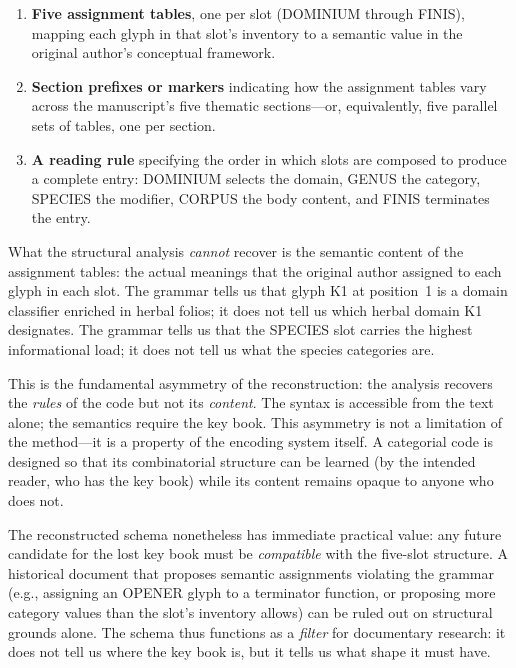 \begin{enumerate}[nosep]
  \item \textbf{Five assignment tables}, one per slot (DOMINIUM through
    FINIS), mapping each glyph in that slot's inventory to a semantic
    value in the original author's conceptual framework.
  \item \textbf{Section prefixes or markers} indicating how the
    assignment tables vary across the manuscript's five thematic
    sections---or, equivalently, five parallel sets of tables, one
    per section.
  \item \textbf{A reading rule} specifying the order in which slots
    are composed to produce a complete entry: DOMINIUM selects the
    domain, GENUS the category, SPECIES the modifier, CORPUS the
    body content, and FINIS terminates the entry.
\end{enumerate}

What the structural analysis \emph{cannot} recover is the semantic
content of the assignment tables: the actual meanings that the original
author assigned to each glyph in each slot. The grammar tells us that
glyph K1 at position~1 is a domain classifier enriched in herbal
folios; it does not tell us which herbal domain K1 designates. The
grammar tells us that the SPECIES slot carries the highest
informational load; it does not tell us what the species categories
are.

This is the fundamental asymmetry of the reconstruction: the analysis
recovers the \emph{rules} of the code but not its \emph{content}. The
syntax is accessible from the text alone; the semantics require the
key book. This asymmetry is not a limitation of the method---it is a
property of the encoding system itself. A categorial code is designed
so that its combinatorial structure can be learned (by the intended
reader, who has the key book) while its content remains opaque to
anyone who does not.

The reconstructed schema nonetheless has immediate practical value:
any future candidate for the lost key book must be \emph{compatible}
with the five-slot structure. A historical document that proposes
semantic assignments violating the grammar (e.g., assigning an OPENER
glyph to a terminator function, or proposing more category values
than the slot's inventory allows) can be ruled out on structural
grounds alone. The schema thus functions as a \emph{filter} for
documentary research: it does not tell us where the key book is, but
it tells us what shape it must have.

